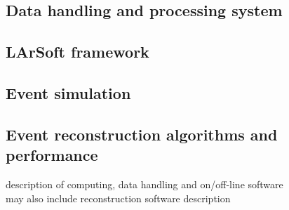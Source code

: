 
\subsection{Data handling and processing system}

\subsection{LArSoft framework}

\subsection{Event simulation}

\subsection{Event reconstruction algorithms and performance}

description of computing, data handling and on/off-line software\\

may also include reconstruction software description

